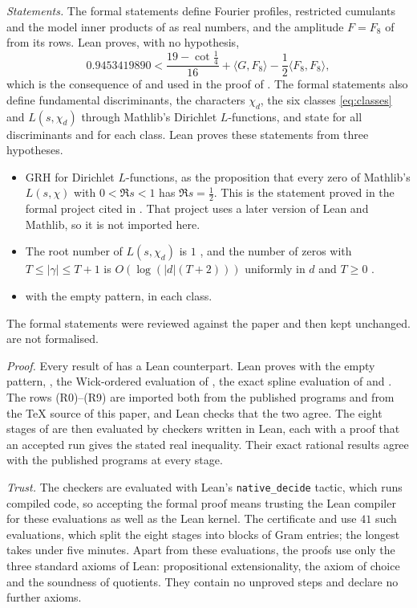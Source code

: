 \documentclass[11pt,colorlinks]{charlie}
\begin{document}
\emph{Statements.} The formal statements define Fourier profiles, restricted cumulants and the model inner products of  as real numbers, and the amplitude $F=F_8$ of  from its rows. Lean proves, with no hypothesis,
\[
 0.9453419890<\frac{19-\cot\frac14}{16}+\langle G,F_8\rangle-\frac12\langle F_8,F_8\rangle,
\]
which is the consequence of  and  used in the proof of . The formal statements also define fundamental discriminants, the characters $\chi_d$, the six classes \eqref{eq:classes} and $L(s,\chi_d)$ through Mathlib's Dirichlet $L$-functions, and state  for all discriminants and for each class. Lean proves these statements from three hypotheses.
\begin{itemize}\small
\item GRH for Dirichlet $L$-functions, as the proposition that every zero of Mathlib's $L(s,\chi)$ with $0<\Re s<1$ has $\Re s=\frac12$. This is the statement proved in the formal project cited in \cite{Alpoge}. That project uses a later version of Lean and Mathlib, so it is not imported here.
\item The root number of $L(s,\chi_d)$ is $1$ \cite[Chs.~2, 6, 9]{Davenport}, and the number of zeros with $T\le|\gamma|\le T+1$ is $O(\log(|d|(T+2)))$ uniformly in $d$ and $T\ge0$ \cite[Ch.~16]{Davenport}.
\item {} with the empty pattern, in each class.
\end{itemize}
The formal statements were reviewed against the paper and then kept unchanged.  are not formalised.

\emph{Proof.} Every result of  has a Lean counterpart. Lean proves  with the empty pattern, , the Wick-ordered evaluation of , the exact spline evaluation of  and . The rows (R0)--(R9) are imported both from the published programs and from the \TeX{} source of this paper, and Lean checks that the two agree. The eight stages of  are then evaluated by checkers written in Lean, each with a proof that an accepted run gives the stated real inequality. Their exact rational results agree with the published programs at every stage.

\emph{Trust.} The checkers are evaluated with Lean's \texttt{native\_decide} tactic, which runs compiled code, so accepting the formal proof means trusting the Lean compiler for these evaluations as well as the Lean kernel. The certificate and  use $41$ such evaluations, which split the eight stages into blocks of Gram entries; the longest takes under five minutes. Apart from these evaluations, the proofs use only the three standard axioms of Lean: propositional extensionality, the axiom of choice and the soundness of quotients. They contain no unproved steps and declare no further axioms.
\end{document}
